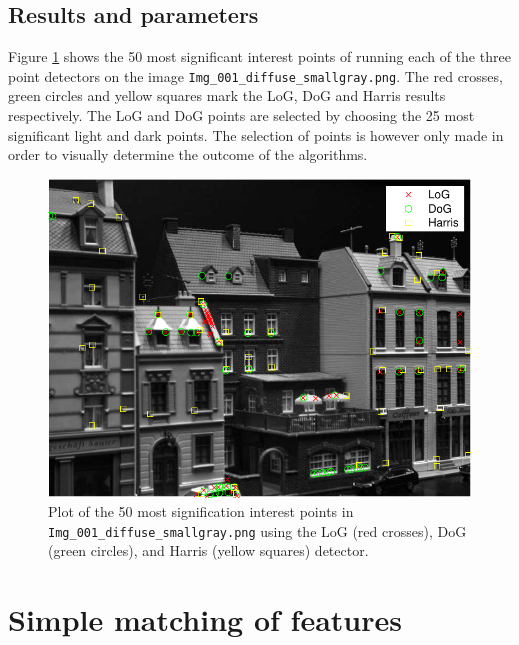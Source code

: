 \documentclass[11pt,a4paper]{article}
\begin{document}
\subsection{Results and parameters}
Figure \ref{fig:i1_points} shows the 50 most significant interest points of running each
of the three point detectors on the image
\texttt{Img\_001\_diffuse\_smallgray.png}. The red crosses, green circles and
yellow squares mark the LoG, DoG and Harris results respectively. The LoG and
DoG points are selected by choosing the 25 most significant light and dark
points. The selection of points is however only made in order to visually
determine the outcome of the algorithms.
\begin{figure}[H]
    \centering
    \includegraphics[width=\textwidth]{images/i1_points.pdf}
    \caption{Plot of the 50 most signification interest points in
        \texttt{Img\_001\_diffuse\_smallgray.png} using the
    LoG (red crosses), DoG (green circles), and Harris (yellow squares)
detector.}
    \label{fig:i1_points}
\end{figure}

\section{Simple matching of features}
\end{document}
